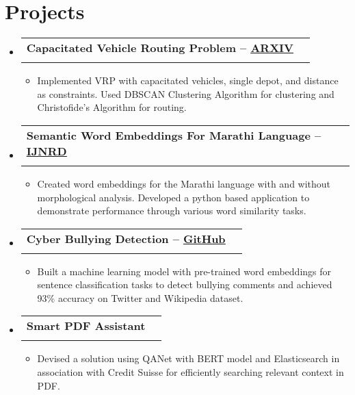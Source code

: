 \documentclass[letterpaper,11pt, ]{article}
\makeatletter
\newcommand{\resumeItem}[1]{%
  \item \small{%
    #1\vspace{-2pt}%
  }%
}
\newcommand{\resumeProjectHeading}[4]{
    \item
    \begin{tabular*}{1.0\textwidth}{l@{\extracolsep{\fill}}r}
      \small#1 & \textbf{\small #2}\\      
      \textit{\small#3} & \textit{\small #4}\\
    \end{tabular*}\vspace{-7pt}
}
\newcommand{\resumeSubHeadingListStart}{\begin{itemize}[leftmargin=0.0in, label={}]}
\newcommand{\resumeSubHeadingListEnd}{\end{itemize}}
\newcommand{\resumeItemListStart}{\begin{itemize}[leftmargin=10pt]}
\newcommand{\resumeItemListEnd}{\end{itemize}\vspace{-5pt}}
\makeatother
\begin{document}

\section{Projects}
    \begin{justify}

        \resumeSubHeadingListStart
          \resumeProjectHeading
          {\textbf{Capacitated Vehicle Routing Problem -- \href{https://arxiv.org/abs/2208.00046}{\underline{ARXIV}}}}{}{}{}
          \vspace{-22pt}
          \resumeItemListStart
            \resumeItem{Implemented VRP with capacitated vehicles, single depot, and distance as constraints. Used DBSCAN Clustering Algorithm for clustering and Christofide’s Algorithm for routing.}          
          \resumeItemListEnd 
        
        \vspace{-2pt}
        
        \resumeProjectHeading
          {\textbf{Semantic Word Embeddings For Marathi Language -- \href{https://www.ijnrd.org/viewpaperforall?paper=IJNRD2210122}{\underline{IJNRD}}}}{}{}{}
          \vspace{-22pt}
          \resumeItemListStart
            \resumeItem{Created word embeddings for the Marathi language with and without morphological analysis. Developed a python based application to demonstrate performance through various word similarity tasks.}          
          \resumeItemListEnd 

        \vspace{-2pt}

        \resumeProjectHeading
          {\textbf{Cyber Bullying Detection -- \href{https://github.com/apurv-choudhari/Cyberbullying-detection-using-svm}{\underline{GitHub}}}}{}{}{}
          \vspace{-22pt}
          \resumeItemListStart
            \resumeItem{Built a machine learning model with pre-trained word embeddings for sentence classification tasks to detect bullying comments and achieved 93\% accuracy on Twitter and Wikipedia dataset.}            
          \resumeItemListEnd 
        
        \vspace{-2pt}

        \resumeProjectHeading
          {\textbf{Smart PDF Assistant}}{}{}{} 
          \vspace{-22pt}
          \resumeItemListStart
            \resumeItem{Devised a solution using QANet with BERT model and Elasticsearch in association with Credit Suisse for efficiently searching relevant context in PDF.}            
          \resumeItemListEnd

        \vspace{-2pt}

        \resumeSubHeadingListEnd
    \end{justify}
\end{document}
